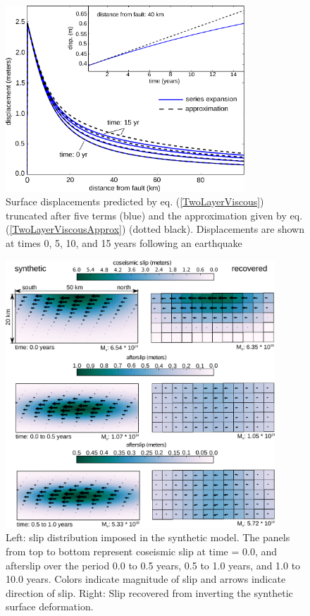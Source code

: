 \documentclass[12pt]{article}
\begin{document}
\begin{figure}[h!]\label{figure1}
  \centering
  \includegraphics[width=0.8\textwidth]{FinalFigures/Figure1.pdf}
  \caption{Surface displacements predicted by
    eq. (\ref{TwoLayerViscous}) truncated after five terms (blue) and
    the approximation given by eq. (\ref{TwoLayerViscousApprox})
    (dotted black).  Displacements are shown at times 0, 5, 10, and 15
    years following an earthquake}
  \label{figure 1}
\end{figure}

\begin{figure}[h!]\label{figure2}
  \centering
  \includegraphics[width=0.9\textwidth]{FinalFigures/Figure2.pdf}
  \caption{Left: slip distribution imposed in the synthetic model.
    The panels from top to bottom represent coseismic slip at time =
    0.0, and afterslip over the period 0.0 to 0.5 years, 0.5 to 1.0
    years, and 1.0 to 10.0 years.  Colors indicate magnitude of slip
    and arrows indicate direction of slip.  Right: Slip recovered from
    inverting the synthetic surface deformation.}
  \label{figure 2}
\end{figure}
\end{document}
